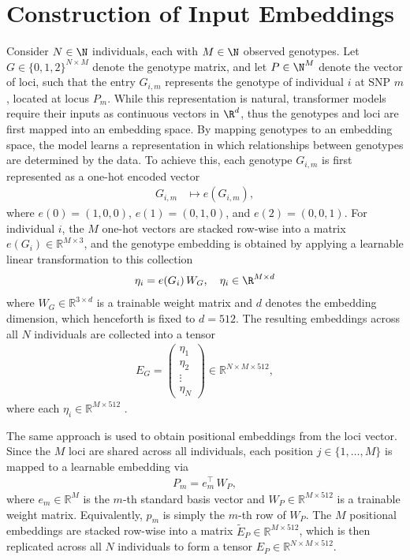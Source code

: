 \newpage
\section{Construction of Input Embeddings} \label{sec: Tokenization and embedding}
Consider $N \in \N$ individuals, each with $M \in \N$ observed genotypes. Let $G \in \{0,1,2\}^{N \times M}$ denote the genotype matrix, and let $P \in \N^M$ denote the vector of loci, such that the entry $G_{i,m}$ represents the genotype of individual $i$ at SNP $m$, located at locus $P_m$.
While this representation is natural, transformer models require their inputs as continuous vectors in $\R^d$, thus the genotypes and loci are first mapped into an embedding space. By mapping genotypes to an embedding space, the model learns a representation in which relationships between genotypes are determined by the data. To achieve this, each genotype $G_{i,m}$ is first represented as a one-hot encoded vector
\begin{align*}
G_{i,m} &\mapsto e(G_{i,m}),
\end{align*}
where $e(0) = (1,0,0)$, $e(1) = (0,1,0)$, and $e(2) = (0,0,1)$. For individual $i$, the $M$ one-hot vectors are stacked row-wise into a matrix $e(G_i) \in \mathbb{R}^{M \times 3}$, and the genotype embedding is obtained by applying a learnable linear transformation to this collection
\begin{align*}
    \eta_i = e(G_i)\, W_G, \quad \eta_i \in \R^{M \times d}
\end{align*}
where $W_G \in \mathbb{R}^{3 \times d}$ is a trainable weight matrix and $d$ denotes the embedding dimension, which henceforth is fixed to $d = 512$. The resulting embeddings across all $N$ individuals are collected into a tensor
\begin{align*}
    E_G = \begin{pmatrix} \eta_1 \\ \eta_2 \\ \vdots \\ \eta_N \end{pmatrix} \in \mathbb{R}^{N \times M \times 512},
\end{align*}
where each $\eta_i \in \mathbb{R}^{M \times 512}$ \citep{Boue2025}. 

The same approach is used to obtain positional embeddings from the loci vector.
Since the $M$ loci are shared across all individuals, each position $j \in \{1, \dots, M\}$
is mapped to a learnable embedding via
\begin{align*}
    P_m = e_m^\top\, W_P,
\end{align*}
where $e_m \in \mathbb{R}^{M}$ is the $m$-th standard basis vector and
$W_P \in \mathbb{R}^{M \times 512}$ is a trainable weight matrix.
Equivalently, $p_m$ is simply the $m$-th row of $W_P$.
The $M$ positional embeddings are stacked row-wise into a matrix
$\tilde{E}_P \in \mathbb{R}^{M \times 512}$, which is then replicated across all
$N$ individuals to form a tensor $E_P \in \mathbb{R}^{N \times M \times 512}$.

